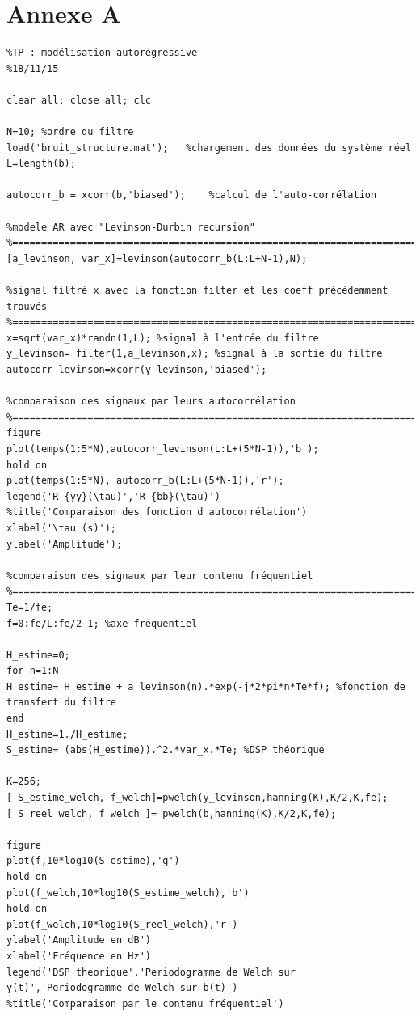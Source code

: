 \documentclass[a4paper]{article}
\begin{document}
 

\newpage
\section*{Annexe A}
\begin{verbatim}
%TP : modélisation autorégressive
%18/11/15

clear all; close all; clc

N=10; %ordre du filtre
load('bruit_structure.mat');   %chargement des données du système réel
L=length(b);

autocorr_b = xcorr(b,'biased');    %calcul de l'auto-corrélation 

%modele AR avec "Levinson-Durbin recursion"
%==========================================================================
[a_levinson, var_x]=levinson(autocorr_b(L:L+N-1),N);

%signal filtré x avec la fonction filter et les coeff précédemment trouvés
%===========================================================================
x=sqrt(var_x)*randn(1,L); %signal à l'entrée du filtre
y_levinson= filter(1,a_levinson,x); %signal à la sortie du filtre
autocorr_levinson=xcorr(y_levinson,'biased');

%comparaison des signaux par leurs autocorrélation
%==========================================================================
figure
plot(temps(1:5*N),autocorr_levinson(L:L+(5*N-1)),'b');
hold on
plot(temps(1:5*N), autocorr_b(L:L+(5*N-1)),'r');
legend('R_{yy}(\tau)','R_{bb}(\tau)')
%title('Comparaison des fonction d autocorrélation')
xlabel('\tau (s)');
ylabel('Amplitude');

%comparaison des signaux par leur contenu fréquentiel
%===========================================================================
Te=1/fe;
f=0:fe/L:fe/2-1; %axe fréquentiel

H_estime=0;
for n=1:N
H_estime= H_estime + a_levinson(n).*exp(-j*2*pi*n*Te*f); %fonction de transfert du filtre
end
H_estime=1./H_estime;
S_estime= (abs(H_estime)).^2.*var_x.*Te; %DSP théorique

K=256;
[ S_estime_welch, f_welch]=pwelch(y_levinson,hanning(K),K/2,K,fe); 
[ S_reel_welch, f_welch ]= pwelch(b,hanning(K),K/2,K,fe);

figure
plot(f,10*log10(S_estime),'g')
hold on
plot(f_welch,10*log10(S_estime_welch),'b')
hold on
plot(f_welch,10*log10(S_reel_welch),'r')
ylabel('Amplitude en dB')
xlabel('Fréquence en Hz')
legend('DSP theorique','Periodogramme de Welch sur y(t)','Periodogramme de Welch sur b(t)')
%title('Comparaison par le contenu fréquentiel')



\end{verbatim}
\end{document}

